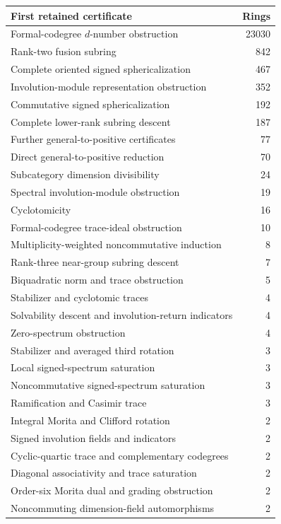 \begin{table}[p]\centering\small
\begin{tabular}{lr}\toprule
First retained certificate & Rings\\\midrule
Formal-codegree $d$-number obstruction & 23030\\
Rank-two fusion subring & 842\\
Complete oriented signed sphericalization & 467\\
Involution-module representation obstruction & 352\\
Commutative signed sphericalization & 192\\
Complete lower-rank subring descent & 187\\
Further general-to-positive certificates & 77\\
Direct general-to-positive reduction & 70\\
Subcategory dimension divisibility & 24\\
Spectral involution-module obstruction & 19\\
Cyclotomicity & 16\\
Formal-codegree trace-ideal obstruction & 10\\
Multiplicity-weighted noncommutative induction & 8\\
Rank-three near-group subring descent & 7\\
Biquadratic norm and trace obstruction & 5\\
Stabilizer and cyclotomic traces & 4\\
Solvability descent and involution-return indicators & 4\\
Zero-spectrum obstruction & 4\\
Stabilizer and averaged third rotation & 3\\
Local signed-spectrum saturation & 3\\
Noncommutative signed-spectrum saturation & 3\\
Ramification and Casimir trace & 3\\
Integral Morita and Clifford rotation & 2\\
Signed involution fields and indicators & 2\\
Cyclic-quartic trace and complementary codegrees & 2\\
Diagonal associativity and trace saturation & 2\\
Order-six Morita dual and grading obstruction & 2\\
Noncommuting dimension-field automorphisms & 2\\

\end{tabular}
\end{table}
